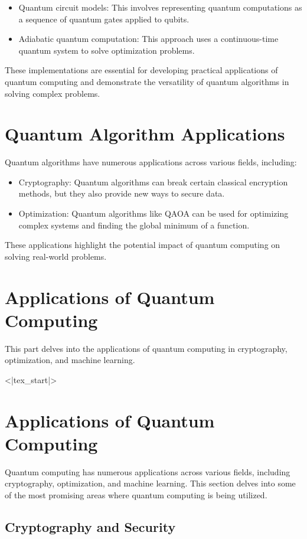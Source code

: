\documentclass{report}%
\begin{document}
\begin{itemize}
\begin{itemize}
\item Quantum circuit models: This involves representing quantum computations as a sequence of quantum gates applied to qubits.
\item Adiabatic quantum computation: This approach uses a continuous-time quantum system to solve optimization problems.
\end{itemize}

These implementations are essential for developing practical applications of quantum computing and demonstrate the versatility of quantum algorithms in solving complex problems.

\section{Quantum Algorithm Applications}

Quantum algorithms have numerous applications across various fields, including:

\begin{itemize}
\item Cryptography: Quantum algorithms can break certain classical encryption methods, but they also provide new ways to secure data.
\item Optimization: Quantum algorithms like QAOA can be used for optimizing complex systems and finding the global minimum of a function.
\end{itemize}

These applications highlight the potential impact of quantum computing on solving real-world problems.%
\section{Applications of Quantum Computing}%
This part delves into the applications of quantum computing in cryptography, optimization, and machine learning.

%
<|tex_start|>

\section{Applications of Quantum Computing}

Quantum computing has numerous applications across various fields, including cryptography, optimization, and machine learning. This section delves into some of the most promising areas where quantum computing is being utilized.

\subsection{Cryptography and Security}


\end{itemize}
\end{document}
